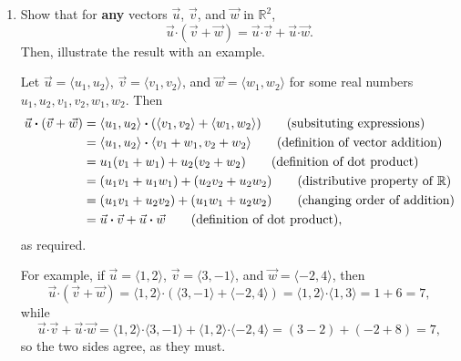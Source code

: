 \documentclass[12pt]{article}
\newcommand{\R}{\mathbb{R}}
\newcommand{\dotp}{\boldsymbol{\cdot}}
\begin{document}
\begin{enumerate}
    
    \item Show that for \textbf{any} vectors $\vec{u}$, $\vec{v}$, and $\vec{w}$ in $\R^2$,
    \[
    \vec{u}\dotp (\vec{v}+\vec{w}) = \vec{u}\dotp\vec{v}+\vec{u}\dotp \vec{w}.
    \]
    Then, illustrate the result with an example.
    
    \bigskip
    
    Let $\vec{u}=\langle u_1,u_2\rangle$, $\vec{v}=\langle v_1,v_2\rangle$, and $\vec{w}=\langle w_1,w_2\rangle$ for some real numbers $u_1,u_2,v_1,v_2,w_1,w_2$. Then
    \begin{align*}
    \vec{u}\dotp (\vec{v}+\vec{w}) & = \langle u_1,u_2\rangle\dotp(\langle v_1,v_2\rangle +\langle w_1,w_2\rangle)\tag{subsituting expressions}\\
    & = \langle u_1,u_2\rangle\dotp\langle v_1+w_1,v_2+w_2\rangle\tag{definition of vector addition}\\
    & = u_1(v_1+w_1)+u_2(v_2+w_2)\tag{definition of dot product}\\
    & = (u_1v_1+u_1w_1)+(u_2v_2+u_2w_2) \tag{distributive property of $\R$}\\
    & = (u_1v_1+u_2v_2)+(u_1w_1+u_2w_2) \tag{changing order of addition}\\
    & = \vec{u}\dotp\vec{v}+\vec{u}\dotp\vec{w} \tag{definition of dot product},
    \end{align*}
    as required.

\medskip
    
    For example, if $\vec{u}=\langle 1,2\rangle$, $\vec{v}=\langle 3,-1\rangle$, and $\vec{w} = \langle -2,4\rangle$, then
    \[
    \vec{u}\dotp(\vec{v}+\vec{w}) = \langle 1,2\rangle\dotp (\langle 3,-1\rangle +\langle -2,4\rangle)=\langle 1,2\rangle\dotp \langle 1,3\rangle = 1+6=7,
    \]
    while
    \[
    \vec{u}\dotp\vec{v}+\vec{u}\dotp\vec{w} = \langle 1,2\rangle\dotp\langle 3,-1\rangle + \langle 1,2\rangle\dotp\langle -2,4\rangle = (3-2)+(-2+8) = 7,
    \]
    so the two sides agree, as they must.
    
   
\end{enumerate}
  
\end{document}
